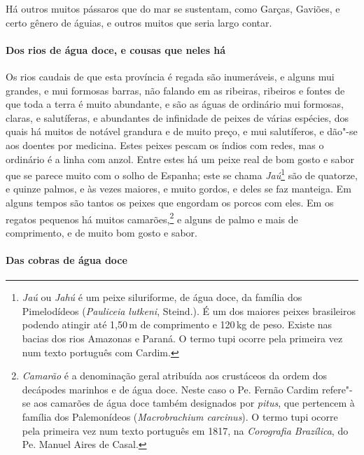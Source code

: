  Há outros muitos pássaros que do mar se sustentam, como Garças,
Gaviões, e certo gênero de águias, e outros muitos que seria largo contar.

\paragraph{Dos rios de água doce, e cousas que neles há}

 Os rios caudais de que esta província é regada são inumeráveis, e
alguns mui grandes, e mui formosas barras, não falando em as ribeiras,
ribeiros e fontes de que toda a terra é muito abundante, e são as águas
de ordinário mui formosas, claras, e salutíferas, e abundantes de
infinidade de peixes de várias espécies, dos quais há muitos de notável
grandura e de muito preço, e mui salutíferos, e dão"-se aos doentes por
medicina. Estes peixes pescam os índios com redes, mas o ordinário é a
linha com anzol. Entre estes há um peixe real de bom gosto e sabor que
se parece muito com o solho de Espanha; este se chama 
\textit{Jaú}\footnote{ \textit{Jaú} ou \textit{Jahú} é um peixe siluriforme,
de água doce, da família dos Pimelodídeos (\textit{Pauliceia lutkeni}, Steind.). 
É um dos maiores peixes brasileiros podendo atingir até
1,50\,m de comprimento e 120\,kg de peso. Existe nas bacias dos rios
Amazonas e Paraná. O termo tupi ocorre pela primeira vez num texto
português com Cardim.} são de quatorze, e quinze palmos, e às vezes
maiores, e muito gordos, e deles se faz manteiga. Em alguns tempos são
tantos os peixes que engordam os porcos com eles. Em os regatos
pequenos há muitos camarões,\footnote{ \textit{Camarão} é a
denominação geral atribuída aos crustáceos da ordem dos decápodes
marinhos e de água doce. Neste caso o Pe. Fernão Cardim refere"-se aos
camarões de água doce também designados por \textit{pitus}, que
pertencem à família dos Palemonídeos (\textit{Macrobrachium carcinus}). 
O termo tupi ocorre pela primeira vez num texto português em 1817, na
\textit{Corografia Brazílica}, do Pe. Manuel Aires de Casal.} e alguns
de palmo e mais de comprimento, e de muito bom gosto e sabor.

\paragraph{Das cobras de água doce}

